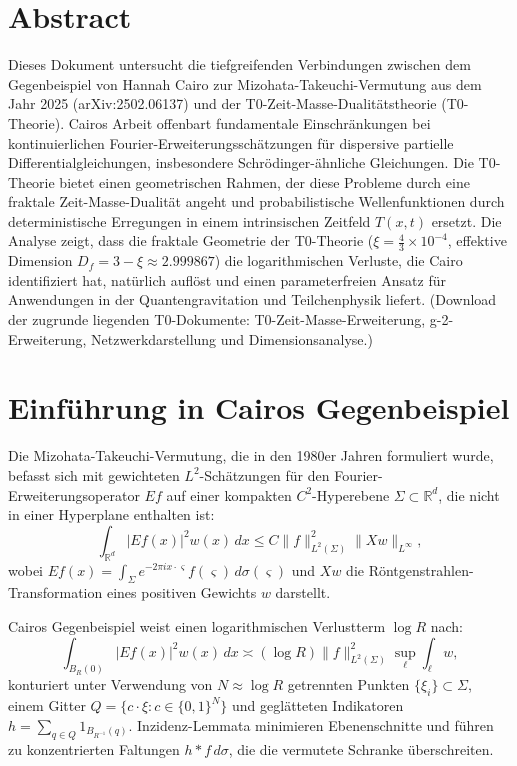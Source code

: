 \section*{Abstract}
		Dieses Dokument untersucht die tiefgreifenden Verbindungen zwischen dem Gegenbeispiel von Hannah Cairo zur Mizohata-Takeuchi-Vermutung aus dem Jahr 2025 (arXiv:2502.06137) und der T0-Zeit-Masse-Dualitätstheorie (T0-Theorie). Cairos Arbeit offenbart fundamentale Einschränkungen bei kontinuierlichen Fourier-Erweiterungsschätzungen für dispersive partielle Differentialgleichungen, insbesondere Schrödinger-ähnliche Gleichungen. Die T0-Theorie bietet einen geometrischen Rahmen, der diese Probleme durch eine fraktale Zeit-Masse-Dualität angeht und probabilistische Wellenfunktionen durch deterministische Erregungen in einem intrinsischen Zeitfeld $T(x,t)$ ersetzt. Die Analyse zeigt, dass die fraktale Geometrie der T0-Theorie ($\xi = \frac{4}{3} \times 10^{-4}$, effektive Dimension $D_f = 3 - \xi \approx 2.999867$) die logarithmischen Verluste, die Cairo identifiziert hat, natürlich auflöst und einen parameterfreien Ansatz für Anwendungen in der Quantengravitation und Teilchenphysik liefert. (Download der zugrunde liegenden T0-Dokumente: T0-Zeit-Masse-Erweiterung, g-2-Erweiterung, Netzwerkdarstellung und Dimensionsanalyse.)

	
	
	\section{Einführung in Cairos Gegenbeispiel}
	
	Die Mizohata-Takeuchi-Vermutung, die in den 1980er Jahren formuliert wurde, befasst sich mit gewichteten $L^2$-Schätzungen für den Fourier-Erweiterungsoperator $Ef$ auf einer kompakten $C^2$-Hyperebene $\Sigma \subset \mathbb{R}^d$, die nicht in einer Hyperplane enthalten ist:
	\begin{equation}
		\int_{\mathbb{R}^d} |Ef(x)|^2 w(x) \, dx \leq C \|f\|_{L^2(\Sigma)}^2 \|Xw\|_{L^\infty},
	\end{equation}
	wobei $Ef(x) = \int_\Sigma e^{-2\pi i x \cdot \varsigma} f(\varsigma) \, d\sigma(\varsigma)$ und $Xw$ die Röntgenstrahlen-Transformation eines positiven Gewichts $w$ darstellt.
	
	Cairos Gegenbeispiel weist einen logarithmischen Verlustterm $\log R$ nach:
	\begin{equation}
		\int_{B_R(0)} |Ef(x)|^2 w(x) \, dx \asymp (\log R) \|f\|_{L^2(\Sigma)}^2 \sup_\ell \int_\ell w,
	\end{equation}
	konturiert unter Verwendung von $N \approx \log R$ getrennten Punkten $\{\xi_i\} \subset \Sigma$, einem Gitter $Q = \{ c \cdot \xi : c \in \{0,1\}^N \}$ und geglätteten Indikatoren $h = \sum_{q \in Q} 1_{B_{R^{-1}}(q)}$. Inzidenz-Lemmata minimieren Ebenenschnitte und führen zu konzentrierten Faltungen $h \ast f \, d\sigma$, die die vermutete Schranke überschreiten.
	
